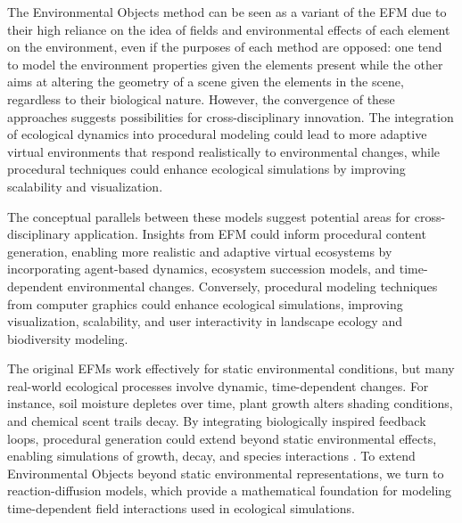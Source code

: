 
The Environmental Objects method can be seen as a variant of the EFM due to their high reliance on the idea of fields and environmental effects of each element on the environment, even if the purposes of each method are opposed: one tend to model the environment properties given the elements present while the other aims at altering the geometry of a scene given the elements in the scene, regardless to their biological nature. However, the convergence of these approaches suggests possibilities for cross-disciplinary innovation. The integration of ecological dynamics into procedural modeling could lead to more adaptive virtual environments that respond realistically to environmental changes, while procedural techniques could enhance ecological simulations by improving scalability and visualization.

The conceptual parallels between these models suggest potential areas for cross-disciplinary application. Insights from EFM could inform procedural content generation, enabling more realistic and adaptive virtual ecosystems by incorporating agent-based dynamics, ecosystem succession models, and time-dependent environmental changes. Conversely, procedural modeling techniques from computer graphics could enhance ecological simulations, improving visualization, scalability, and user interactivity in landscape ecology and biodiversity modeling. 

The original EFMs work effectively for static environmental conditions, but many real-world ecological processes involve dynamic, time-dependent changes. For instance, soil moisture depletes over time, plant growth alters shading conditions, and chemical scent trails decay. By integrating biologically inspired feedback loops, procedural generation could extend beyond static environmental effects, enabling simulations of growth, decay, and species interactions \cite{Okubo2001,Wojtek2022}. To extend Environmental Objects beyond static environmental representations, we turn to reaction-diffusion models, which provide a mathematical foundation for modeling time-dependent field interactions used in ecological simulations. 





